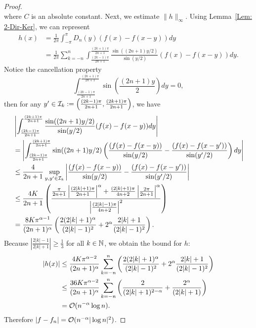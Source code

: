\begin{proof}
\begin{equation}
    \end{equation}
    where $C$ is an absolute constant. Next, we estimate $\|h\|_{\infty}$. Using Lemma~\ref{Lem: 2-Dir-Ker}, we can represent
    \begin{equation}
    \begin{aligned}
        h(x) &= \frac{1}{2\pi} \int_{-\pi}^{\pi} D_n(y) (f(x) - f(x - y) ) dy \\
        &= \frac{1}{2\pi} \sum_{k=-n}^{n} \int_{\frac{(2k-1)\pi}{2n+1}}^{\frac{(2k+1)\pi}{2n+1}} \frac{\sin((2n+1) y/2)}{\sin(y/2)}  (f(x) - f(x - y) ) dy.
    \end{aligned}
    \end{equation}
    Notice the cancellation property
    \begin{equation}
         \int_{\frac{(2k-1)\pi}{2n+1}}^{\frac{(2k+1)\pi}{2n+1}} \sin\left(\frac{(2n+1) y}{2}\right) dy = 0,
    \end{equation}
    then for any $y'\in \mathcal I_k:= \left(\frac{(2k-1)\pi}{2n+1}, \frac{(2k+1)\pi}{2n+1}\right)$, we have 
    \begin{equation}
    \label{EQ: CANCELLATION F}
    \begin{aligned}
    &\left| \int_{\frac{(2k-1)\pi}{2n+1}}^{\frac{(2k+1)\pi}{2n+1}} \frac{\sin((2n+1) y/2)}{\sin(y/2)}  (f(x) - f(x - y) ) dy \right| \\
    &= \left| \int_{\frac{(2k-1)\pi}{2n+1}}^{\frac{(2k+1)\pi}{2n+1}} \sin((2n+1) y/2)  \left( \frac{(f(x) - f(x - y) )}{\sin(y/2)} - \frac{(f(x) - f(x - y') )}{\sin(y'/2)} \right) dy \right| \\
    &\le \frac{4}{2n+1}\sup_{y,y'\in \mathcal I_k} \left| \frac{(f(x) - f(x - y) )}{\sin(y/2)} - \frac{(f(x) - f(x - y') )}{\sin(y'/2)} \right|\\
    &\le \frac{4K}{2n+1}\left(\frac{\frac{\pi}{2n+1}\left|\frac{(2|k|+1)\pi}{2n+1}\right|^{\alpha}+ \frac{(2|k|+1)\pi}{4n+2}\left|\frac{2\pi}{2n+1}\right|^{\alpha}}{\left|\frac{(2|k|-1)\pi}{4n+2}\right|^2}\right)\\
    &=\frac{8K\pi^{\alpha-1}}{(2n+1)^{\alpha}} \left( \frac{2(2|k|+1)^{\alpha}}{(2|k|-1)^2}+ 2^{\alpha}\frac{2|k|+1}{(2|k|-1)^2} \right).
    \end{aligned}
    \end{equation}
    Because $\left|\frac{2|k|-1}{2|k|+1}\right|\ge \frac{1}{3}$ for all $k\in\mathbb N$, we obtain the bound for $h$:
    \begin{equation}
    \begin{aligned}
        |h(x)| &\le  \frac{4K\pi^{\alpha-2}}{(2n+1)^{\alpha}} \sum_{k=-n}^{n}  \left( \frac{2(2|k|+1)^{\alpha}}{(2|k|-1)^2}+ 2^{\alpha}\frac{2|k|+1}{(2|k|-1)^2} \right)\\&
        \le  \frac{36K\pi^{\alpha-2}}{(2n+1)^{\alpha}} \sum_{k=-n}^{n}  \left( \frac{2}{(2|k|+1)^{2-\alpha}}+ \frac{ 2^{\alpha}}{(2|k|+1)} \right)\\
        &= \mathcal O(n^{-\alpha} \log n).
    \end{aligned}
    \end{equation}
    Therefore $|f - f_n|=\mathcal O( n^{-\alpha} |\log n|^2 )$.
\end{proof}
